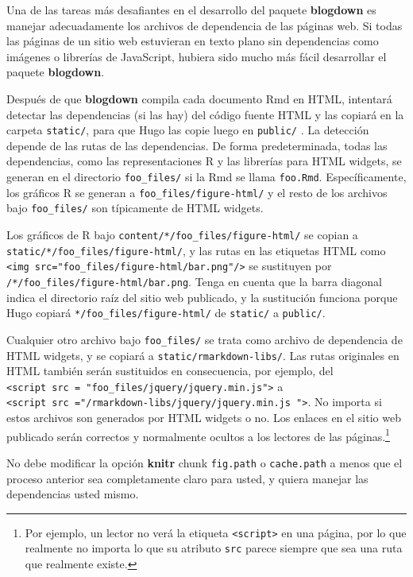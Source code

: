 \documentclass[12pt,]{krantz}
\theoremstyle{definition}
\theoremstyle{definition}
\theoremstyle{definition}
\theoremstyle{remark}
\begin{document}
Una de las tareas más desafiantes en el desarrollo del paquete
\textbf{blogdown} es manejar adecuadamente los archivos de dependencia
 de las páginas web. Si todas las páginas
de un sitio web estuvieran en texto plano sin dependencias como imágenes
o librerías de JavaScript, hubiera sido mucho más fácil desarrollar el
paquete \textbf{blogdown}.

Después de que \textbf{blogdown} compila cada documento Rmd en HTML,
intentará detectar las dependencias (si las hay) del código fuente HTML
y las copiará en la carpeta \texttt{static/}, para que Hugo las copie
luego en \texttt{public/} . La detección depende de las rutas de las
dependencias. De forma predeterminada, todas las dependencias, como las
representaciones R y las librerías para HTML widgets, se generan en el
directorio \texttt{foo\_files/} si la Rmd se llama \texttt{foo.Rmd}.
Específicamente, los gráficos R se generan a
\texttt{foo\_files/figure-html/} y el resto de los archivos bajo
\texttt{foo\_files/} son típicamente de HTML widgets.

Los gráficos de R bajo \texttt{content/*/foo\_files/figure-html/} se
copian a \texttt{static/*/foo\_files/figure-html/}, y las rutas en las
etiquetas HTML como
\texttt{\textless{}img\ src="foo\_files/figure-html/bar.png"/\textgreater{}}
se sustituyen por \texttt{/*/foo\_files/figure-html/bar.png}. Tenga en
cuenta que la barra diagonal indica el directorio raíz del sitio web
publicado, y la sustitución funciona porque Hugo copiará
\texttt{*/foo\_files/figure-html/} de \texttt{static/} a
\texttt{public/}.

Cualquier otro archivo bajo \texttt{foo\_files/} se trata como archivo
de dependencia de HTML widgets, y se copiará a
\texttt{static/rmarkdown-libs/}. Las rutas originales en HTML también
serán sustituidos en consecuencia, por ejemplo, del
\texttt{\textless{}script\ src\ =\ "foo\_files/jquery/jquery.min.js"\textgreater{}}
a
\texttt{\textless{}script\ src\ ="/rmarkdown-libs/jquery/jquery.min.js\ "\textgreater{}}.
No importa si estos archivos son generados por HTML widgets o no. Los
enlaces en el sitio web publicado serán correctos y normalmente ocultos
a los lectores de las páginas.\footnote{Por ejemplo, un lector no verá
  la etiqueta \texttt{\textless{}script\textgreater{}} en una página,
  por lo que realmente no importa lo que su atributo \texttt{src} parece
  siempre que sea una ruta que realmente existe.}

No debe modificar la opción \textbf{knitr} chunk \texttt{fig.path} o
\texttt{cache.path} a menos que el proceso anterior sea completamente
claro para usted, y quiera manejar las dependencias usted mismo.
\end{document}
